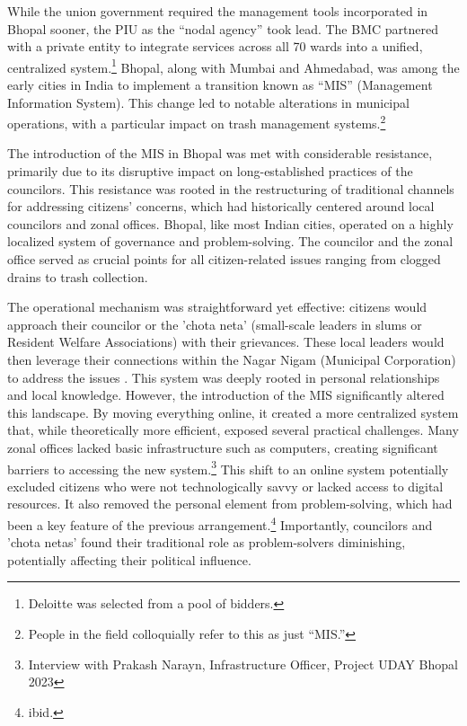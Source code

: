 While the union government required the management tools incorporated in Bhopal sooner, the PIU as the ``nodal agency'' took lead. The BMC partnered with a private entity to integrate services across all 70 wards into a unified, centralized system.\footnote{Deloitte was selected from a pool of bidders.} Bhopal, along with Mumbai and Ahmedabad, was among the early cities in India to implement a transition known as ``MIS'' (Management Information System). This change led to notable alterations in municipal operations, with a particular impact on trash management systems.\footnote{People in the field colloquially refer to this as just ``MIS.''}

The introduction of the MIS in Bhopal was met with considerable resistance, primarily due to its disruptive impact on long-established practices of the councilors. This resistance was rooted in the restructuring of traditional channels for addressing citizens' concerns, which had historically centered around local councilors and zonal offices. Bhopal, like most Indian cities, operated on a highly localized system of governance and problem-solving. The councilor and the zonal office served as crucial points for all citizen-related issues ranging from clogged drains to trash collection.

The operational mechanism was straightforward yet effective: citizens would approach their councilor or the 'chota neta' (small-scale leaders in slums or Resident Welfare Associations) with their grievances. These local leaders would then leverage their connections within the Nagar Nigam (Municipal Corporation) to address the issues \citep{Auerbach2019}. This system was deeply rooted in personal relationships and local knowledge. However, the introduction of the MIS significantly altered this landscape. By moving everything online, it created a more centralized system that, while theoretically more efficient, exposed several practical challenges. Many zonal offices lacked basic infrastructure such as computers, creating significant barriers to accessing the new system.\footnote{Interview with Prakash Narayn, Infrastructure Officer, Project UDAY Bhopal 2023} This shift to an online system potentially excluded citizens who were not technologically savvy or lacked access to digital resources. It also removed the personal element from problem-solving, which had been a key feature of the previous arrangement.\footnote{ibid.} Importantly, councilors and 'chota netas' found their traditional role as problem-solvers diminishing, potentially affecting their political influence.

